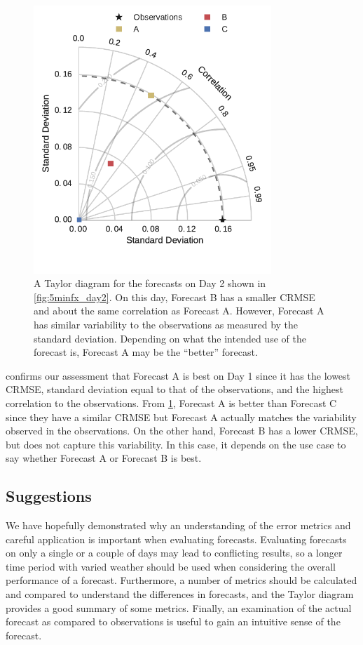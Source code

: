 \begin{figure}[p]
\centering
\includegraphics[width=0.8\textwidth]{figs/taylor_Day_2.pdf}
\vspace{-3em}
\caption[Taylor diagram for day 2 example forecasts]{A Taylor diagram
  for the forecasts on Day 2 shown in \cref{fig:5minfx_day2}. On this
  day, Forecast B has a smaller CRMSE and about the same correlation
  as Forecast A. However, Forecast A has similar variability to the
  observations as measured by the standard deviation. Depending on
  what the intended use of the forecast is, Forecast A may be the
  ``better'' forecast.}
\label{fig:taylor_day2}
\end{figure}

 confirms our assessment that Forecast A is best
on Day 1 since it has the lowest CRMSE, standard deviation equal to
that of the observations, and the highest correlation to the
observations.
From \cref{fig:taylor_day2}, Forecast A is better than Forecast C
since they have a similar CRMSE but Forecast A actually matches the
variability observed in the observations.
On the other hand, Forecast B has a lower CRMSE, but does not capture
this variability.
In this case, it depends on the use case to say whether Forecast A or
Forecast B is best.

\subsection{Suggestions}
We have hopefully demonstrated why an understanding of the error
metrics and careful application is important when evaluating
forecasts.
Evaluating forecasts on only a single or a couple of days may lead to
conflicting results, so a longer time period with varied weather
should be used when considering the overall performance of a forecast.
Furthermore, a number of metrics should be calculated and compared to
 understand the differences in forecasts, and the Taylor diagram
provides a good summary of some metrics.
Finally, an examination of the actual forecast as compared to
observations is useful to gain an intuitive sense of the forecast.

